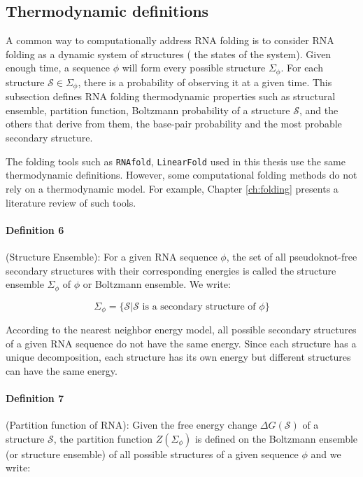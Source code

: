 \subsection{Thermodynamic definitions}
A common way to computationally address RNA folding is to consider RNA folding as a dynamic system of structures ( the states of the system). Given enough time, a sequence $\phi$ will form every possible structure $\Sigma_{\phi}$. For each structure $\mathcal{S} \in \Sigma_{\phi}$,  there is a probability of observing it at a given time. This subsection defines RNA folding thermodynamic properties such as structural ensemble, partition function, Boltzmann probability of a structure $\mathcal{S}$, and the others that derive from them, the base-pair probability and the most probable secondary structure. 

The folding tools such as \texttt{RNAfold}, \texttt{LinearFold} used in this thesis use the same thermodynamic definitions. However, some computational folding methods do not rely on a thermodynamic model. For example, Chapter \ref{ch:folding} presents a literature review of such tools. 

\paragraph{\textbf{Definition 6}}  (Structure Ensemble):  For a given RNA sequence $\phi$,  the set of all pseudoknot-free secondary structures with their corresponding energies is called the structure ensemble $\Sigma_{\phi}$ of $\phi$ or Boltzmann ensemble.  We write: 

$$
\Sigma_{\phi} = \{ \mathcal{S} | \mathcal{S} \text{ is a secondary structure of $\phi$}\}
$$

According to the nearest neighbor energy model, all possible secondary structures of a given RNA sequence do not have the same energy. Since each structure has a unique decomposition, each structure has its own energy but different structures can have the same energy.

\paragraph{\textbf{Definition 7}} (Partition function of RNA): Given the free energy change $\Delta G(\mathcal{S})$ of a structure $\mathcal{S}$, the partition function $Z(\Sigma_{\phi})$ is defined on the Boltzmann ensemble (or structure ensemble) of all possible structures of a given sequence $\phi$ and we write: 

